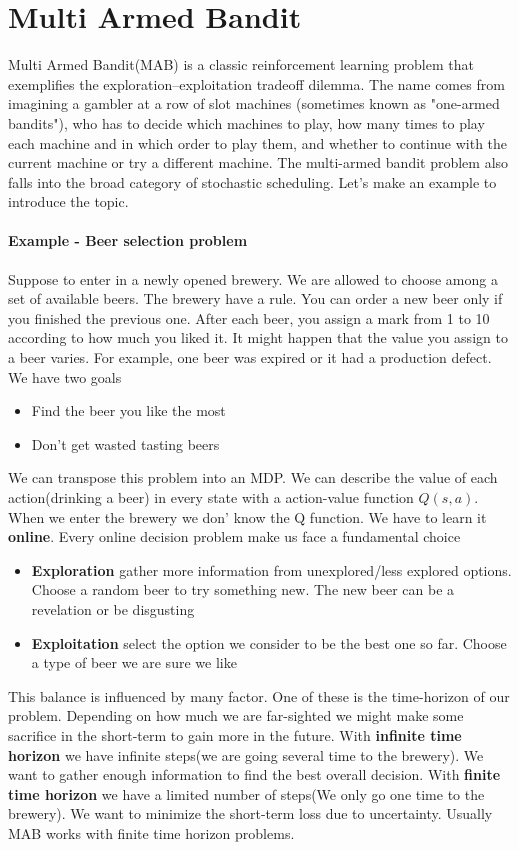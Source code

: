 \documentclass[main.tex]{subfiles}
\begin{document}
\section{Multi Armed Bandit}
Multi Armed Bandit(MAB) is a classic reinforcement learning problem that exemplifies the exploration–exploitation tradeoff dilemma. The name comes from imagining a gambler at a row of slot machines (sometimes known as "one-armed bandits"), who has to decide which machines to play, how many times to play each machine and in which order to play them, and whether to continue with the current machine or try a different machine. The multi-armed bandit problem also falls into the broad category of stochastic scheduling. Let's make an example to introduce the topic.
\paragraph{Example - Beer selection problem} Suppose to enter in a newly opened brewery. We are allowed to choose among a set of available beers. The brewery have a rule. You can order a new beer only if you finished the previous one. After each beer, you assign a mark from 1 to 10 according to how much you liked it. It might happen that the value you assign to a beer varies. For example, one beer was expired or it had a production defect. We have two goals
\begin{itemize}
    \item Find the beer you like the most
    \item Don't get wasted tasting beers
\end{itemize}
We can transpose this problem into an MDP. We can describe the value of each action(drinking a beer) in every state with a action-value function $Q(s,a)$. When we enter the brewery we don' know the Q function. We have to learn it \textbf{online}\footnotemark. Every online decision problem make us face a fundamental choice
\begin{itemize}
    \item \textbf{Exploration} gather more information from unexplored/less explored options. Choose a random beer to try something new. The new beer can be a revelation or be disgusting
    \item \textbf{Exploitation} select the option we consider to be the best one so far. Choose a type of beer we are sure we like
\end{itemize}
This balance is influenced by many factor. One of these is the time-horizon of our problem. Depending on how much we are far-sighted we might make some sacrifice in the short-term to gain more in the future. With \textbf{infinite time horizon} we have infinite steps(we are going several time to the brewery). We want to gather enough information to find the best overall decision. With \textbf{finite time horizon} we have a limited number of steps(We only go one time to the brewery). We want to minimize the short-term loss due to uncertainty. Usually MAB works with finite time horizon problems.
\end{document}
